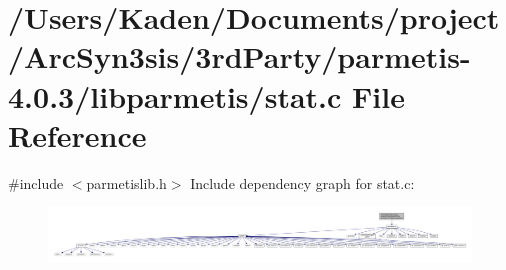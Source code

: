 \hypertarget{a00969}{}\section{/\+Users/\+Kaden/\+Documents/project/\+Arc\+Syn3sis/3rd\+Party/parmetis-\/4.0.3/libparmetis/stat.c File Reference}
\label{a00969}
{\ttfamily \#include $<$parmetislib.\+h$>$}\newline
Include dependency graph for stat.\+c\+:\nopagebreak
\begin{figure}[H]
\begin{center}
\leavevmode
\includegraphics[width=350pt]{a00970}
\end{center}
\end{figure}
